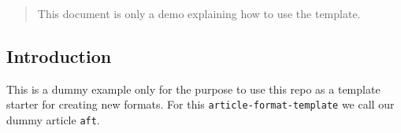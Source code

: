 \documentclass[manuscript,screen,review]{acmart}
\begin{document}
        \author{Mark van der Graaf}
  
        \author{Mark de Reuver}
  
      

\begin{abstract}
This document is only a demo explaining how to use the template.    
\end{abstract}




\maketitle

\setlength{\parskip}{-0.1pt}

\subsection{Introduction}\label{sec-intro}

This is a dummy example only for the purpose to use this repo as a
template starter for creating new formats. For this
\texttt{article-format-template} we call our dummy article \texttt{aft}.
\end{document}
